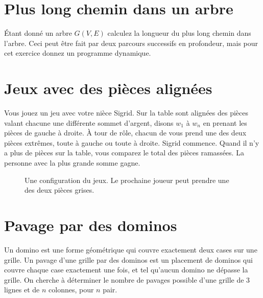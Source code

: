 \documentclass[12pt]{article}
\begin{document}
\section{Plus long chemin dans un arbre}

Étant donné un arbre $G(V,E)$ calculez la longueur du plus long chemin dans l'arbre.  Ceci peut être fait par deux parcours successifs en profondeur, mais pour cet exercice donnez un programme dynamique.

\section{Jeux avec des pièces alignées}

Vous jouez un jeu avec votre nièce Sigrid.  Sur la table sont alignées des pièces valant chacune une différente sommet d'argent, disons $w_1$ à $w_n$ en prenant les pièces de gauche à droite.  À tour de rôle, chacun de vous prend une des deux pièces extrêmes, toute à gauche ou toute à droite.  Sigrid commence. Quand il n'y a plus de pièces sur la table, vous comparez le total des pièces ramassées.  La personne avec la plus grande somme gagne.
\begin{figure}[ht]
\begin{center}
\end{center}
\caption{Une configuration du jeux. Le prochaine joueur peut prendre une des deux pièces grises.}
\end{figure}

\section{Pavage par des dominos}

Un domino est une forme géométrique qui couvre exactement deux cases sur une grille.  Un pavage d'une grille par des dominos est un placement de dominos qui couvre chaque case exactement une fois, et tel qu'aucun domino ne dépasse la grille.  On cherche à déterminer le nombre de pavages possible d'une grille de 3 lignes et de $n$ colonnes, pour $n$ pair.
\end{document}
